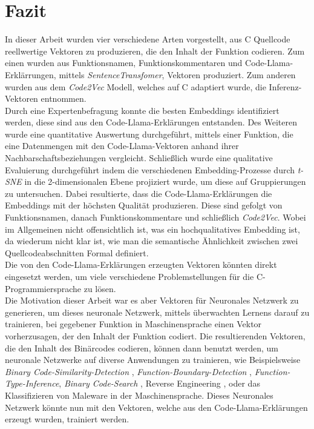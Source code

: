 \documentclass[12pt,letterpaper,ngerman]{article}
\begin{document}
\section{Fazit}
In dieser Arbeit wurden vier verschiedene Arten vorgestellt,
aus C Quellcode reellwertige Vektoren zu produzieren, die den 
Inhalt der Funktion codieren. Zum einen wurden aus Funktionsnamen, 
Funktionskommentaren und Code-Llama-Erklärrungen, mittels 
\textit{SentenceTransfomer}, Vektoren produziert.
Zum anderen wurden aus dem \textit{Code2Vec} Modell, welches
auf C adaptiert wurde, die Inferenz-Vektoren entnommen.\\
Durch eine Expertenbefragung konnte die besten Embeddings
identifiziert werden, diese sind aus den Code-Llama-Erklärungen
entstanden. Des Weiteren wurde eine quantitative Auswertung 
durchgeführt, mittels einer Funktion, die eine Datenmengen
mit den Code-Llama-Vektoren anhand ihrer 
Nachbarschaftsbeziehungen vergleicht.
Schließlich wurde eine qualitative Evaluierung durchgeführt 
indem die verschiedenen Embedding-Prozesse durch \textit{t-SNE}
in die 2-dimensionalen Ebene projiziert wurde, um diese
auf Gruppierungen zu untersuchen. 
Dabei resultierte, dass die Code-Llama-Erklärungen die 
Embeddings mit der höchsten Qualität produzieren.
Diese sind gefolgt von Funktionsnamen, danach Funktionskommentare 
und schließlich \textit{Code2Vec}.
Wobei im Allgemeinen nicht offensichtlich ist, was ein 
hochqualitatives Embedding ist, da wiederum nicht klar ist,
wie man die semantische Ähnlichkeit zwischen zwei 
Quellcodeabschnitten Formal definiert.\\
Die von den Code-Llama-Erklärungen erzeugten Vektoren
könnten direkt eingesetzt werden, um viele verschiedene
Problemstellungen für die C-Programmiersprache zu lösen.\\
Die Motivation dieser Arbeit war es aber Vektoren für 
Neuronales Netzwerk zu generieren, um dieses neuronale Netzwerk,
mittels überwachten Lernens darauf zu trainieren, bei gegebener
Funktion in Maschinensprache einen Vektor vorherzusagen, der den
Inhalt der Funktion codiert.
Die resultierenden Vektoren, die den Inhalt des Binärcodes codieren,
können dann benutzt werden, um neuronale Netzwerke auf diverse
Anwendungen zu trainieren, wie Beispielsweise
\textit{Binary Code-Similarity-Detection} \cite{jtrans},
\textit{Function-Boundary-Detection} \cite{190918},
\textit{Function-Type-Inference}\cite{203650},
\textit{Binary Code-Search} \cite{9345532},
Reverse Engineering \cite{reverse-engeneering},
oder das Klassifizieren von 
Maleware in der Maschinensprache\cite{maleware-detection}. 
Dieses Neuronales Netzwerk könnte nun mit den Vektoren,
welche aus den Code-Llama-Erklärungen erzeugt wurden,
trainiert werden.
\end{document}
